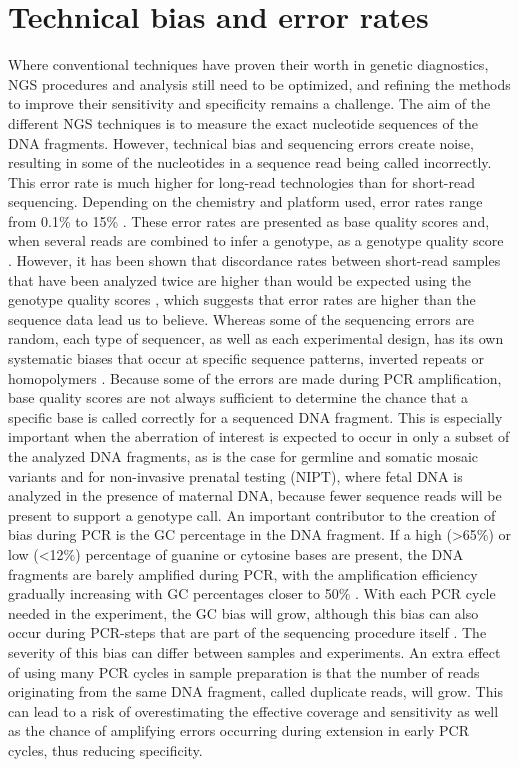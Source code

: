 \section[Technical bias and error rates]{Technical bias and error rates}\label{intro_bias}
Where conventional techniques have proven their worth in genetic diagnostics, NGS procedures and analysis still need to be optimized, and refining the methods to improve their sensitivity and specificity remains a challenge. 
The aim of the different NGS techniques is to measure the exact nucleotide sequences of the DNA fragments. 
However, technical bias and sequencing errors create noise, resulting in some of the nucleotides in a sequence read being called incorrectly. 
This error rate is much higher for long-read technologies than for short-read sequencing. Depending on the chemistry and platform used, error rates range from 0.1\% to 15\% \cite{Goodwin_2016}. 
These error rates are presented as base quality scores and, when several reads are combined to infer a genotype, as a genotype quality score \cite{Nielsen_2011}. 
However, it has been shown that discordance rates between short-read samples that have been analyzed twice are higher than would be expected using the genotype quality scores \cite{Wall_2014,Schirmer_2015}, which suggests that error rates are higher than the sequence data lead us to believe. 
Whereas some of the sequencing errors are random, each type of sequencer, as well as each experimental design, has its own systematic biases that occur at specific sequence patterns, inverted repeats or homopolymers \cite{Nakamura_2011,Schirmer_2015}. 
Because some of the errors are made during PCR amplification, base quality scores are not always sufficient to determine the chance that a specific base is called correctly for a sequenced DNA fragment.
This is especially important when the aberration of interest is expected to occur in only a subset of the analyzed DNA fragments, as is the case for germline and somatic mosaic variants and for non-invasive prenatal testing (NIPT), where fetal DNA is analyzed in the presence of maternal DNA, because fewer sequence reads will be present to support a genotype call. 
An important contributor to the creation of bias during PCR is the GC percentage in the DNA fragment. If a high (\textgreater65\%) or low (\textless12\%) percentage of guanine or cytosine bases are present, the DNA fragments are barely amplified during PCR, with the amplification efficiency gradually increasing with GC percentages closer to 50\% \cite{Aird_2011}. 
With each PCR cycle needed in the experiment, the GC bias will grow, although this bias can also occur during PCR-steps that are part of the sequencing procedure itself \cite{Roeh_2017}. 
The severity of this bias can differ between samples and experiments. 
An extra effect of using many PCR cycles in sample preparation is that the number of reads originating from the same DNA fragment, called duplicate reads, will grow. 
This can lead to a risk of overestimating the effective coverage and sensitivity as well as the chance of amplifying errors occurring during extension in early PCR cycles, thus reducing specificity.  

